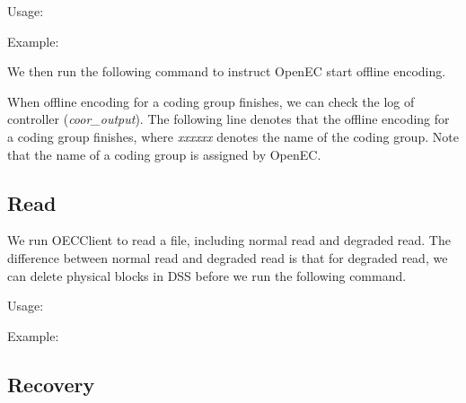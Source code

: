 \documentclass[letterpaper,12pt]{article}
\newcommand{\openec}{{\sf\small OpenEC}\xspace}
\begin{document}
Usage:
\begin{center}
\noindent{}
\end{center}

Example:
\begin{center}
\noindent{}
\end{center}

We then run the following command to instruct \openec start offline encoding.

\begin{center}
\noindent{}
\end{center}

When offline encoding for a coding group finishes, we can check the log of controller ({\sl coor\_output}).
The following line denotes that the offline encoding for a coding group finishes, where {\sl xxxxxx} denotes
the name of the coding group. Note that the name of a coding group is assigned by \openec.

\begin{center}
\noindent{}
\end{center}


\subsection{Read}

We run OECClient to read a file, including normal read and degraded read. 
The difference between normal read and degraded read is that for degraded read, we
can delete physical blocks in DSS before we run the following command.

Usage:
\begin{center}
\noindent{}
\end{center}

Example:
\begin{center}
\noindent{}
\end{center}

\subsection{Recovery}
\end{document}
